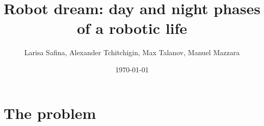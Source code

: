 \documentclass[12pt]{beamer}
\title[Robot dream]{Robot dream: day and night phases of a robotic life} %
\author{Larisa Safina, Alexander Tchitchigin, Max Talanov, Manuel Mazzara}
\institute[IU] %
{
Software Science and Engineering Laboratory, IU \\ %
\medskip
\textit{l.safina@innopolis.ru} %
}
\date{\today} %
\begin{document}
\begin{frame}
\titlepage %
\end{frame}



\section{The problem} %
\end{document}
